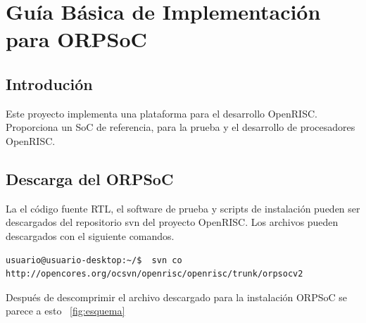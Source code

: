 \chapter{Guía Básica de Implementación para ORPSoC}

 \section{Introdución}
Este proyecto implementa una plataforma para el desarrollo OpenRISC. Proporciona un SoC de referencia, para la prueba y el desarrollo de procesadores OpenRISC.

 \section{Descarga del ORPSoC}
La el código fuente RTL, el software de prueba y scripts de instalación pueden ser descargados del repositorio svn del proyecto OpenRISC. Los archivos pueden descargados con el siguiente comandos.

\begin{lstlisting}[breaklines]
 usuario@usuario-desktop:~/$  svn co http://opencores.org/ocsvn/openrisc/openrisc/trunk/orpsocv2
\end{lstlisting}

Después de descomprimir el archivo descargado para la instalación ORPSoC se parece a esto ~\ref{fig:esquema} 

